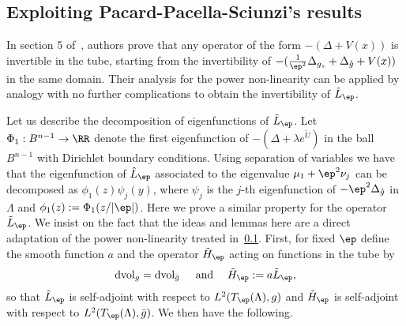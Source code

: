 
\subsection{Exploiting Pacard-Pacella-Sciunzi's results}\label{sec:exploiting-pacard}

In section 5 of~\cite{Pacard2014}, authors prove that any operator of the form
$-(\Delta+V(x))$ is invertible in the tube, starting from the invertibility of
$-(\frac{1}{\ep^2}\Delta_{g_z}+\Delta_{\mathring g}+V(x))$ in the same domain.
Their analysis for the power non-linearity can be applied by analogy with no
further complications to obtain the invertibility of $\tilde L_\ep$.

Let us describe the decomposition of eigenfunctions of $\tilde L_\ep$. Let
$\Phi_1:B^{n-1}\to \RR$ denote the first eigenfunction of $-(\Delta+\lambda
e^{\tilde U})$ in the ball $B^{n-1}$ with Dirichlet boundary conditions. Using
separation of variables we have that the eigenfunction of $\hat L_\ep$
associated to the eigenvalue $\mu_1+\ep^2\nu_j$ can be decomposed as
$\phi_1(z)\psi_j(y)$, where $\psi_j$ is the $j$-th eigenfunction of
$-\ep^2\Delta_{\mathring g}$ in $\Lambda$ and $\phi_1(z):=\Phi_1(z/|\ep|)$. Here
we prove a similar property for the operator $\tilde L_\ep$. We insist on the
fact that the ideas and lemmas here are a direct adaptation of the power
non-linearity treated in~\ref{sec:exploiting-pacard}. First, for fixed $\ep$
define the smooth function $a$ and the operator $\tilde H_\ep$ acting on
functions in the tube by
\begin{equation}
    \operatorname{dvol}_g = \operatorname{dvol}_{\bar g}\quad\;\mbox{and}\;
    \quad \tilde H_\ep:= a\tilde L_\ep,
\end{equation}
so that $\tilde L_\ep$ is self-adjoint with respect to $L^2(T_\ep(\Lambda),g)$
and $\tilde H_\ep$ is self-adjoint with respect to $L^2(T_\ep(\Lambda),
\bar{g})$. We then have the following.

